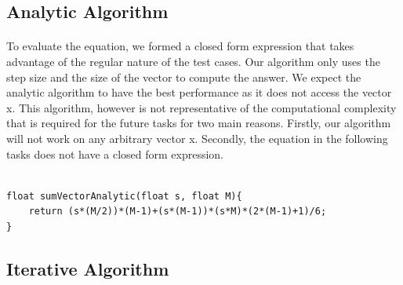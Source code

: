 \documentclass{article}
\begin{document}
\subsection{Analytic Algorithm}
\paragraph{}
To evaluate the equation, we formed a closed form expression that takes advantage of the regular nature of the test cases. Our algorithm only uses the step size and the size of the vector to compute the answer. We expect the analytic algorithm to have the best performance as it does not access the vector x. This algorithm, however is not representative of the computational complexity that is required for the future tasks for two main reasons. Firstly, our algorithm will not work on any arbitrary vector x. Secondly, the equation in the following tasks does not have a closed form expression.\\\\
\lstset{
language=C,
showspaces=false,
showstringspaces=false,
}         

\begin{lstlisting}[frame=single]
float sumVectorAnalytic(float s, float M){
	return (s*(M/2))*(M-1)+(s*(M-1))*(s*M)*(2*(M-1)+1)/6;
}
\end{lstlisting}

\subsection{Iterative Algorithm}
\end{document}
